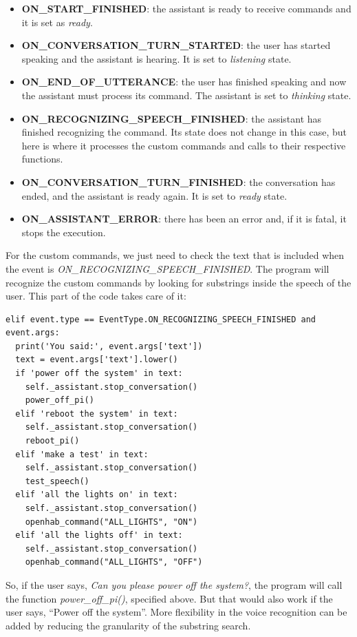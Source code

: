 \begin{itemize}
	\item \textbf{ON\_START\_FINISHED}: the assistant is ready to receive commands and it is set as \textit{ready}.
    \item \textbf{ON\_CONVERSATION\_TURN\_STARTED}: the user has started speaking and the assistant is hearing. It is set to
    \textit{listening} state.
    \item \textbf{ON\_END\_OF\_UTTERANCE}: the user has finished speaking and now the assistant must process its command. The assistant
    is set to \textit{thinking} state.
    \item \textbf{ON\_RECOGNIZING\_SPEECH\_FINISHED}: the assistant has finished recognizing the command. Its state does not change
    in this case, but here is where it processes the custom commands and calls to their respective functions.
    \item \textbf{ON\_CONVERSATION\_TURN\_FINISHED}: the conversation has ended, and the assistant is ready again. It is set to
    \textit{ready} state.
    \item \textbf{ON\_ASSISTANT\_ERROR}: there has been an error and, if it is fatal, it stops the execution.
\end{itemize}

For the custom commands, we just need to check the text that is included when the event is \textit{ON\_RECOGNIZING\_SPEECH\_FINISHED}.
The program will recognize the custom commands by looking for substrings inside the speech of the user. This part of the code
takes care of it:

\begin{lstlisting}[style=PythonCode]
elif event.type == EventType.ON_RECOGNIZING_SPEECH_FINISHED and event.args:
  print('You said:', event.args['text'])
  text = event.args['text'].lower()
  if 'power off the system' in text:
    self._assistant.stop_conversation()
    power_off_pi()
  elif 'reboot the system' in text:
    self._assistant.stop_conversation()
    reboot_pi()
  elif 'make a test' in text:
    self._assistant.stop_conversation()
    test_speech()
  elif 'all the lights on' in text:
    self._assistant.stop_conversation()
    openhab_command("ALL_LIGHTS", "ON")
  elif 'all the lights off' in text:
    self._assistant.stop_conversation()
    openhab_command("ALL_LIGHTS", "OFF")
\end{lstlisting}

So, if the user says, \textit{Can you please power off the system?}, the program will call the function \textit{power\_off\_pi()},
specified above. But that would also work if the user says, “Power off the system”. More flexibility in the voice recognition can
be added by reducing the granularity of the substring search.

